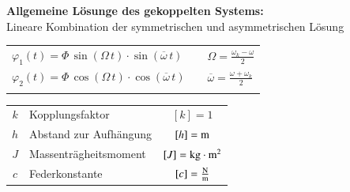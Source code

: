 \textbf{Allgemeine Lösunge des gekoppelten Systems:} \\
Lineare Kombination der symmetrischen und asymmetrischen Lösung \\

\renewcommand{\arraystretch}{1.3}
\begin{tabular}{lll}
$\varphi_1(t) = \Phi \, \sin( \Omega\, t) \cdot \sin(\overline{\omega} \, t)$ & & $\Omega = \frac{\omega_k - \omega}{2}$ \\
$\varphi_2(t) = \Phi \, \cos( \Omega\, t) \cdot \cos(\overline{\omega} \, t)$ & & $\overline{\omega} = \frac{\omega + \omega_k}{2}$ \\
\\
\end{tabular}
\renewcommand{\arraystretch}{1}


\begin{tabular}{c l c}
$k$ & Kopplungsfaktor & $[k] = 1$ \\
$h$ & Abstand zur Aufhängung & $[h] = \mathrm{m}$ \\
$J$ & Massenträgheitsmoment & $[J] = \mathrm{kg} \cdot \mathrm{m}^2 $ \\
$c$ & Federkonstante & $[c] = \frac{\mathrm{N}}{\mathrm{m}}$ \\
\end{tabular}


